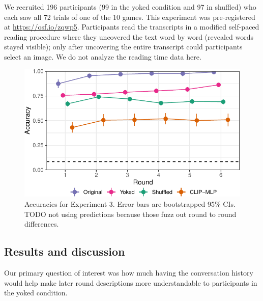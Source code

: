 \documentclass[10pt, letterpaper]{article}
\begin{document}
We recruited 196 participants (99 in the yoked condition and 97 in
shuffled) who each saw all 72 trials of one of the 10 games. This
experiment was pre-registered at \url{https://osf.io/zqwp5}.
Participants read the transcripts in a modified self-paced reading
procedure where they uncovered the text word by word (revealed words
stayed visible); only after uncovering the entire transcript could
participants select an image. We do not analyze the reading time data
here.

\begin{CodeChunk}
\begin{figure}[t]

{\centering \includegraphics[width=0.9\linewidth]{figs/fig-yoked-1} 

}

\caption[Accuracies for Experiment 3]{Accuracies for Experiment 3. Error bars are bootstrapped 95\% CIs. TODO not using predictions because those fuzz out round to round differences. \label{yoked}}\label{fig:fig-yoked}
\end{figure}
\end{CodeChunk}

\subsection{Results and discussion}\label{results-and-discussion-1}

Our primary question of interest was how much having the conversation
history would help make later round descriptions more understandable to
participants in the yoked condition.
\end{document}
